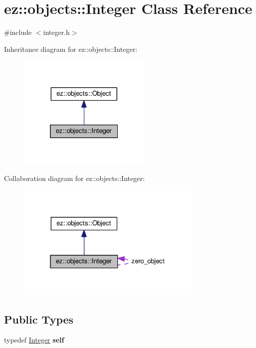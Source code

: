 \hypertarget{classez_1_1objects_1_1Integer}{}\section{ez\+:\+:objects\+:\+:Integer Class Reference}
\label{classez_1_1objects_1_1Integer}


{\ttfamily \#include $<$integer.\+h$>$}



Inheritance diagram for ez\+:\+:objects\+:\+:Integer\+:
\nopagebreak
\begin{figure}[H]
\begin{center}
\leavevmode
\includegraphics[width=181pt]{classez_1_1objects_1_1Integer__inherit__graph}
\end{center}
\end{figure}


Collaboration diagram for ez\+:\+:objects\+:\+:Integer\+:
\nopagebreak
\begin{figure}[H]
\begin{center}
\leavevmode
\includegraphics[width=253pt]{classez_1_1objects_1_1Integer__coll__graph}
\end{center}
\end{figure}
\subsection*{Public Types}
\begin{DoxyCompactItemize}
\item 
\mbox{\label{classez_1_1objects_1_1Integer_a54d5c86b73369ceacc24cb50211967ec}} 
typedef \hyperlink{classez_1_1objects_1_1Integer}{Integer} {\bfseries self}
\end{DoxyCompactItemize}
